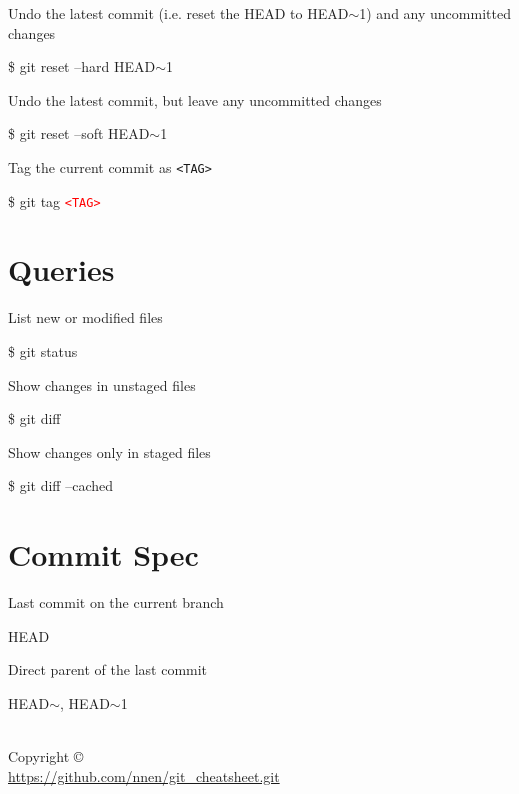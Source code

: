 \documentclass[10pt,a4paper]{article}
\newenvironment{cheatentry}{%
    \noindent%
    \begin{minipage}{\columnwidth}%
    \small%
    \noindent%
}{%
    \end{minipage}%
}
\newcommand{\entrysep}{\vspace{1em}}
\newcommand{\cheatcmd}[1]{%
    \noindent\begin{cmdbox}{\large\ttfamily\fontseries{b}\selectfont #1}\end{cmdbox}
}
\newcommand{\cheatmetavar}[1]{%
    \textcolor{red}{\texttt{\textless{}#1\textgreater{}}}%
}
\newcommand{\cheatmetavarref}[1]{%
    {\texttt{\textless{}#1\textgreater{}}}%
}
\newcommand{\HEADP}[1][]{HEAD$\sim$#1}
\begin{document}
\begin{multicols}{4}
\entrysep{}%

\begin{cheatentry}%
Undo the latest commit (i.e. reset the HEAD to HEAD$\sim$1) and any uncommitted changes
\cheatcmd{\$ git reset --hard \HEADP[1]}
\end{cheatentry}

\entrysep{}%

\begin{cheatentry}%
Undo the latest commit, but leave any uncommitted changes
\cheatcmd{\$ git reset --soft \HEADP[1]}
\end{cheatentry}

\entrysep{}%

\begin{cheatentry}%
Tag the current commit as \cheatmetavarref{TAG}
\cheatcmd{\$ git tag \cheatmetavar{TAG}}
\end{cheatentry}

\section{Queries}

\begin{cheatentry}%
List new or modified files
\cheatcmd{\$ git status}
\end{cheatentry}

\entrysep{}%

\begin{cheatentry}%
Show changes in unstaged files
\cheatcmd{\$ git diff}
\end{cheatentry}

\entrysep{}%

\begin{cheatentry}%
Show changes only in staged files
\cheatcmd{\$ git diff --cached}
\end{cheatentry}

\section{Commit Spec}

\begin{cheatentry}%
Last commit on the current branch
\cheatcmd{HEAD}
\end{cheatentry}

\entrysep{}%

\begin{cheatentry}%
Direct parent of the last commit
\cheatcmd{\HEADP, \HEADP[1]}
\end{cheatentry}

\vfill

\makeatletter
\begin{flushright}\
\@title\\
Copyright \copyright{} \@author\\
\url{https://github.com/nnen/git_cheatsheet.git}
\end{flushright}
\makeatother

\end{multicols}
\end{document}
